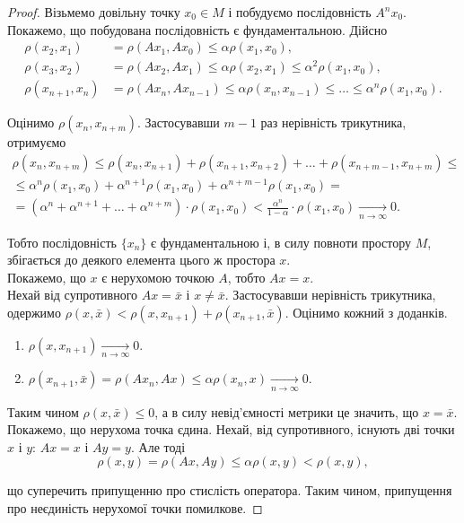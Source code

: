 \begin{proof}
	Візьмемо довільну точку $x_0\in M$ і побудуємо послідовність $A^nx_0$. Покажемо, що побудована послідовність є фундаментальною. Дійсно
	\begin{align*}
		\rho(x_2, x_1) &= \rho(A x_1, A x_0) \le \alpha \rho (x_1, x_0), \\
		\rho(x_3, x_2) &= \rho(A x_2, A x_1) \le \alpha \rho (x_2, x_1) \le \alpha^2 \rho(x_1, x_0), \\
		\rho(x_{n+1}, x_n) &= \rho(A x_n, A x_{n-1}) \le \alpha \rho (x_n, x_{n-1}) \le \ldots \le \alpha^n \rho(x_1, x_0).
	\end{align*}

	Оцінимо $\rho(x_n, x_{n+m})$. Застосувавши $m-1$ раз нерівність трикутника, отримуємо 
	\begin{multline*}
		\rho(x_n, x_{n+m}) \le \rho(x_n, x_{n+1}) + \rho(x_{n+1}, x_{n+2}) + \ldots + \rho(x_{n+m-1},x_{n+m}) \le \\
		\le \alpha^n \rho(x_1, x_0) + \alpha^{n+1} \rho(x_1, x_0) +\alpha^{n+m-1} \rho(x_1, x_0) = \\
		= (\alpha^n + \alpha^{n+1} + \ldots + \alpha^{n + m}) \cdot \rho(x_1, x_0) < \frac{\alpha^n}{1 - \alpha} \cdot \rho(x_1, x_0) \xrightarrow[n\to\infty]{} 0.
	\end{multline*}
	
	Тобто послідовність $\{x_n\}$ є фундаментальною і, в силу повноти простору $M$, збігається до деякого елемента цього ж простора $x$. \\

	Покажемо, що $x$ є нерухомою точкою $A$, тобто $Ax=x$.\\

	Нехай від супротивного $Ax=\bar x$ і $x\ne\bar x$. Застосувавши нерівність трикутника, одержимо $\rho(x,\bar x) < \rho(x, x_{n+1}) + \rho(x_{n+1}, \bar x)$. Оцінимо кожний з доданків.
	\begin{enumerate}
		\item $\rho(x, x_{n+1}) \xrightarrow[n\to\infty]{} 0$.
		\item $\rho(x_{n+1}, \bar x) = \rho(Ax_n, Ax) \le \alpha \rho(x_n, x) \xrightarrow[n\to\infty]{} 0$.
	\end{enumerate}
	
	Таким чином $\rho(x, \bar x) \le 0$, а в силу невід'ємності метрики це значить, що $x = \bar x$. \\

	Покажемо, що нерухома точка єдина. Нехай, від супротивного, існують дві точки $x$ і $y$: $A x = x$ і $A y = y$. Але тоді
	\begin{equation*}
		\rho(x, y) = \rho(A x, A y) \le \alpha \rho(x, y) < \rho(x, y),
	\end{equation*}
	
	що суперечить припущенню про стислість оператора. Таким чином, припущення про неєдиність нерухомої точки помилкове.
\end{proof}

